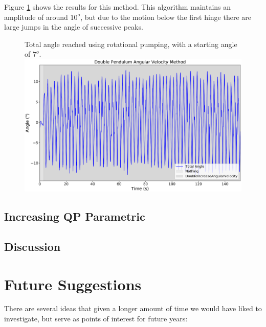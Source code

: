 \documentclass[11pt]{article}
\begin{document}
Figure \ref{fig:DoublePendulumData3} shows the results for this method. This algorithm maintains an amplitude of around $10^o$, but due to the motion below the first hinge there are large jumps in the angle of successive peaks.

    \begin{figure}[!htb]
        \centering
        \captionbox
             {Total angle reached using rotational pumping, with a starting angle of $7^o$.\label{fig:DoublePendulumData3}}
             {\includegraphics[width=1.0\textwidth]{DoublePendulumRotationalAngular.eps}}
    \end{figure}

\subsection{Increasing QP Parametric}

\subsection{Discussion}

\section{Future Suggestions}
There are several ideas that given a longer amount of time we would have liked to investigate, but serve as points of interest for future years:
\end{document}
